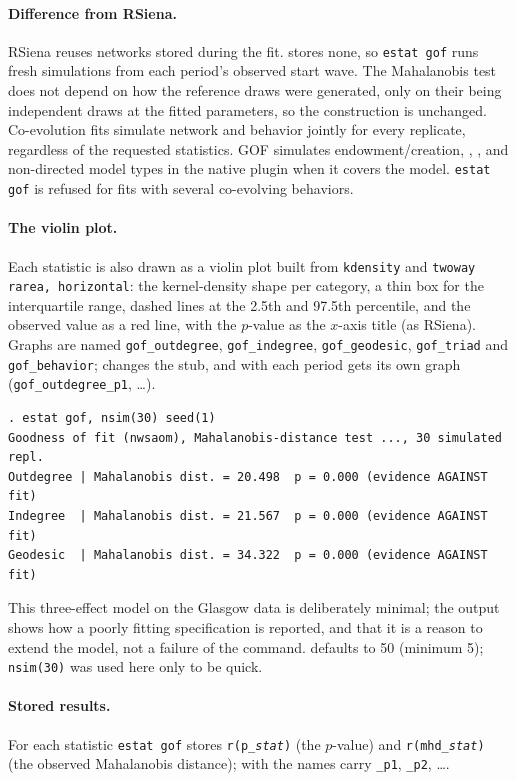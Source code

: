 \paragraph{Difference from RSiena.} RSiena reuses networks stored during the fit. \nwsaom{} stores none, so \texttt{estat gof} runs fresh simulations from each period's observed start wave. The Mahalanobis test does not depend on how the reference draws were generated, only on their being independent draws at the fitted parameters, so the construction is unchanged. Co-evolution fits simulate network and behavior jointly for every replicate, regardless of the requested statistics. GOF simulates endowment/creation, , ,  and non-directed model types in the native plugin when it covers the model. \texttt{estat gof} is refused for fits with several co-evolving behaviors.

\paragraph{The violin plot.} Each statistic is also drawn as a violin plot built from \texttt{kdensity} and \texttt{twoway rarea, horizontal}: the kernel-density shape per category, a thin box for the interquartile range, dashed lines at the 2.5th and 97.5th percentile, and the observed value as a red line, with the $p$-value as the $x$-axis title (as RSiena). Graphs are named \texttt{gof\_outdegree}, \texttt{gof\_indegree}, \texttt{gof\_geodesic}, \texttt{gof\_triad} and \texttt{gof\_behavior};  changes the stub, and with  each period gets its own graph (\texttt{gof\_outdegree\_p1}, \ldots).

\begin{lstlisting}
. estat gof, nsim(30) seed(1)
Goodness of fit (nwsaom), Mahalanobis-distance test ..., 30 simulated repl.
Outdegree | Mahalanobis dist. = 20.498  p = 0.000 (evidence AGAINST fit)
Indegree  | Mahalanobis dist. = 21.567  p = 0.000 (evidence AGAINST fit)
Geodesic  | Mahalanobis dist. = 34.322  p = 0.000 (evidence AGAINST fit)
\end{lstlisting}
This three-effect model on the Glasgow data is deliberately minimal; the output shows how a poorly fitting specification is reported, and that it is a reason to extend the model, not a failure of the command.  defaults to 50 (minimum 5); \texttt{nsim(30)} was used here only to be quick.

\paragraph{Stored results.} For each statistic \texttt{estat gof} stores \texttt{r(p\_\emph{stat})} (the $p$-value) and \texttt{r(mhd\_\emph{stat})} (the observed Mahalanobis distance); with  the names carry \texttt{\_p1}, \texttt{\_p2}, \ldots.

